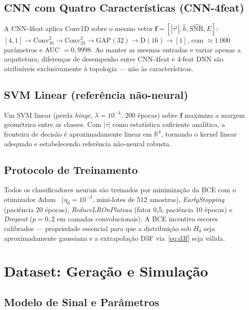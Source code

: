\documentclass{sbrt}
\begin{document}
\subsection{CNN com Quatro Características (CNN-4feat)}\label{sec:cnn4feat}

A CNN-4feat aplica Conv1D sobre o mesmo vetor $\mathbf{f} = [|\tau^i|, \hat{h}, \widehat{\text{SNR}}, E]$:
$[4,1]\!\to\!\text{Conv}_{16}^{2}\!\to\!\text{Conv}_{32}^{2}\!\to\!\text{GAP}(32)\!\to\!\text{D}(16)\!\to\![1]$,
com ${\approx}1{.}000$ parâmetros e AUC $= 0{,}9998$. Ao manter as mesmas entradas e variar apenas a arquitetura, diferenças de desempenho entre CNN-4feat e 4-feat DNN são atribuíveis exclusivamente à topologia — não às características.

\subsection{SVM Linear (referência não-neural)}\label{sec:svm}

Um SVM linear (perda \textit{hinge}, $\lambda = 10^{-4}$, 200 épocas) sobre $\mathbf{f}$ maximiza a margem geométrica entre as classes. Com $|\tau|$ como estatística suficiente analítica, a fronteira de decisão é aproximadamente linear em $\mathbb{R}^4$, tornando o kernel linear adequado e estabelecendo referência não-neural robusta.

\subsection{Protocolo de Treinamento}

Todos os classificadores neurais são treinados por minimização da BCE com o otimizador Adam~\cite{ref_adam} ($\eta_0 = 10^{-3}$, mini-lotes de 512 amostras), \textit{EarlyStopping} (paciência 20 épocas), \textit{ReduceLROnPlateau} (fator 0,5, paciência 10 épocas) e \textit{Dropout} ($p = 0{,}2$ em camadas convolucionais). A BCE incentiva escores calibrados — propriedade essencial para que a distribuição sob $H_0$ seja aproximadamente gaussiana e a extrapolação D3F via~\eqref{eq:d3f} seja válida.


\section{Dataset: Geração e Simulação}

\subsection{Modelo de Sinal e Parâmetros}
\end{document}
